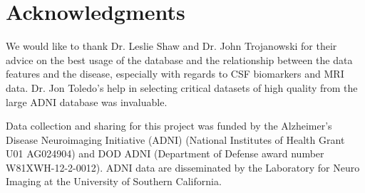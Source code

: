 \documentclass{article}
\begin{document}
 
\section*{Acknowledgments} 
 
We would like to thank Dr. Leslie Shaw and Dr. John Trojanowski for their advice on the best usage of the database and the relationship between the data features and the disease, especially with regards to CSF biomarkers and MRI data. Dr. Jon Toledo's help in selecting critical datasets of high quality from the large ADNI database was invaluable. 

Data collection and sharing for this project was funded by the Alzheimer's Disease Neuroimaging Initiative (ADNI) (National Institutes of Health Grant U01 AG024904) and DOD ADNI (Department of Defense award number W81XWH-12-2-0012). ADNI data are disseminated by the Laboratory for Neuro Imaging at the University of Southern California.



\end{document}
